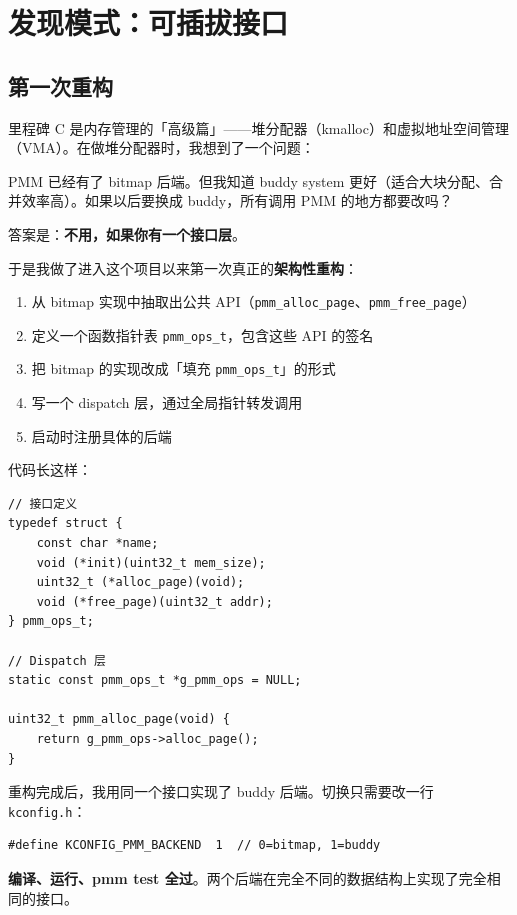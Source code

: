 \chapter{发现模式：可插拔接口}

\section{第一次重构}

里程碑 C 是内存管理的「高级篇」——堆分配器（kmalloc）和虚拟地址空间管理（VMA）。在做堆分配器时，我想到了一个问题：

PMM 已经有了 bitmap 后端。但我知道 buddy system 更好（适合大块分配、合并效率高）。如果以后要换成 buddy，所有调用 PMM 的地方都要改吗？

答案是：\textbf{不用，如果你有一个接口层}。

于是我做了进入这个项目以来第一次真正的\textbf{架构性重构}：

\begin{enumerate}
  \item 从 bitmap 实现中抽取出公共 API（\texttt{pmm\_alloc\_page}、\texttt{pmm\_free\_page}）
  \item 定义一个函数指针表 \texttt{pmm\_ops\_t}，包含这些 API 的签名
  \item 把 bitmap 的实现改成「填充 \texttt{pmm\_ops\_t}」的形式
  \item 写一个 dispatch 层，通过全局指针转发调用
  \item 启动时注册具体的后端
\end{enumerate}

代码长这样：

\begin{lstlisting}[style=cstyle]
// 接口定义
typedef struct {
    const char *name;
    void (*init)(uint32_t mem_size);
    uint32_t (*alloc_page)(void);
    void (*free_page)(uint32_t addr);
} pmm_ops_t;

// Dispatch 层
static const pmm_ops_t *g_pmm_ops = NULL;

uint32_t pmm_alloc_page(void) {
    return g_pmm_ops->alloc_page();
}
\end{lstlisting}

重构完成后，我用同一个接口实现了 buddy 后端。切换只需要改一行 \texttt{kconfig.h}：

\begin{lstlisting}[style=cstyle]
#define KCONFIG_PMM_BACKEND  1  // 0=bitmap, 1=buddy
\end{lstlisting}

\textbf{编译、运行、pmm test 全过}。两个后端在完全不同的数据结构上实现了完全相同的接口。

